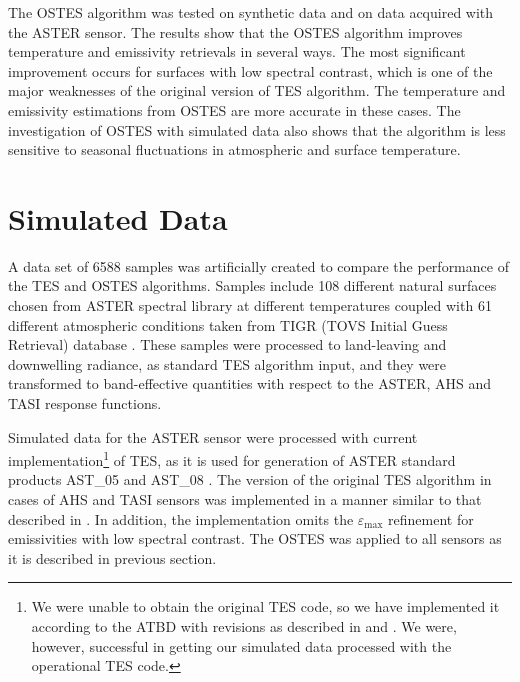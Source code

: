 The OSTES algorithm was tested on synthetic data and on data acquired with the ASTER sensor. The results show that the OSTES algorithm improves temperature and emissivity retrievals in several ways. The most significant improvement occurs for surfaces with low spectral contrast, which is one of the major weaknesses of the original version of TES algorithm. The temperature and emissivity estimations from OSTES are more accurate in these cases. The investigation of OSTES with simulated data also shows that the algorithm is less sensitive to seasonal fluctuations in atmospheric and surface temperature.

\section{Simulated Data}

A data set of 6588 samples was artificially created to compare the performance of the TES and OSTES algorithms. Samples include 108 different natural surfaces chosen from ASTER spectral library \cite{baldridge_aster_2009} at different temperatures coupled with 61 different atmospheric conditions taken from TIGR (TOVS Initial Guess Retrieval) database \cite{chedin_improved_1985, chevallier_neural_1998}. 
These samples were processed to land-leaving and downwelling radiance, as standard TES algorithm input, and they were transformed to band-effective quantities with respect to the ASTER, AHS and TASI response functions.

Simulated data for the ASTER sensor were processed with current implementation\footnote{We were unable to obtain the original TES code, so we have implemented it according to the ATBD \cite{gillespie_temperature/emissivity_1999} with revisions as described in \cite{gustafson_revisions_2006} and \cite{sabol_field_2009}. We were, however, successful in getting our simulated data processed with the operational TES code.} of TES, as it is used for generation of ASTER standard products AST\_05 and AST\_08 \cite{bjorn_personal_communication}. The version of the original TES algorithm in cases of AHS and TASI sensors was implemented in a manner similar to that described in \cite{jimenez-munoz_surface_2012}. In addition, the implementation omits the $\varepsilon_\mathrm{max}$ refinement for emissivities with low spectral contrast. The OSTES was applied to all sensors as it is described in previous section.

